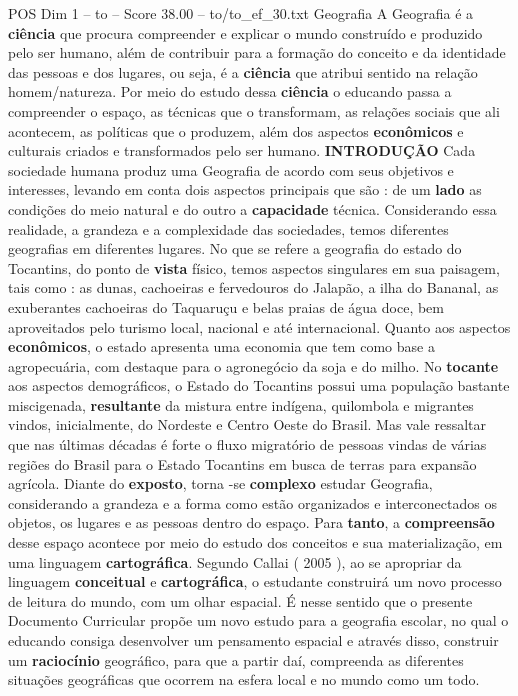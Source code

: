 \begin{textsample}{POS Dim 1 – to – Score 38.00 – to/to\_ef\_30.txt}  \label{ex:f1_pos_260}
Geografia A Geografia é a \textbf{ciência} que procura compreender e explicar o mundo construído e produzido pelo ser humano, além de contribuir para a formação do conceito e da identidade das pessoas e dos lugares, ou seja, é a \textbf{ciência} que atribui sentido na relação homem/natureza.
Por meio do estudo dessa \textbf{ciência} o educando passa a compreender o espaço, as técnicas que o transformam, as relações sociais que ali acontecem, as políticas que o produzem, além dos aspectos \textbf{econômicos} e culturais criados e transformados pelo ser humano. \textbf{INTRODUÇÃO} Cada sociedade humana produz uma Geografia de acordo com seus objetivos e interesses, levando em conta dois aspectos principais que são : de um \textbf{lado} as condições do meio natural e do outro a \textbf{capacidade} técnica.
Considerando essa realidade, a grandeza e a complexidade das sociedades, temos diferentes geografias em diferentes lugares.
No que se refere a geografia do estado do Tocantins, do ponto de \textbf{vista} físico, temos aspectos singulares em sua paisagem, tais como : as dunas, cachoeiras e fervedouros do Jalapão, a ilha do Bananal, as exuberantes cachoeiras do Taquaruçu e belas praias de água doce, bem aproveitados pelo turismo local, nacional e até internacional.
Quanto aos aspectos \textbf{econômicos}, o estado apresenta uma economia que tem como base a agropecuária, com destaque para o agronegócio da soja e do milho.
No \textbf{tocante} aos aspectos demográficos, o Estado do Tocantins possui uma população bastante miscigenada, \textbf{resultante} da mistura entre indígena, quilombola e migrantes vindos, inicialmente, do Nordeste e Centro Oeste do Brasil.
Mas vale ressaltar que nas últimas décadas é forte o fluxo migratório de pessoas vindas de várias regiões do Brasil para o Estado Tocantins em busca de terras para expansão agrícola.
Diante do \textbf{exposto}, torna -se \textbf{complexo} estudar Geografia, considerando a grandeza e a forma como estão organizados e interconectados os objetos, os lugares e as pessoas dentro do espaço.
Para \textbf{tanto}, a \textbf{compreensão} desse espaço acontece por meio do estudo dos conceitos e sua materialização, em uma linguagem \textbf{cartográfica}.
Segundo Callai ( 2005 ), ao se apropriar da linguagem \textbf{conceitual} e \textbf{cartográfica}, o estudante construirá um novo processo de leitura do mundo, com um olhar espacial.
É nesse sentido que o presente Documento Curricular propõe um novo estudo para a geografia escolar, no qual o educando consiga desenvolver um pensamento espacial e através disso, construir um \textbf{raciocínio} geográfico, para que a partir daí, compreenda as diferentes situações geográficas que ocorrem na esfera local e no mundo como um todo.

\end{textsample}
